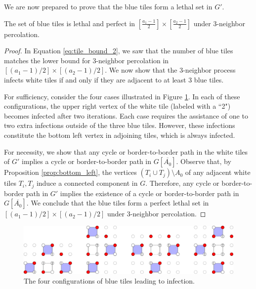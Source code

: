 We are now prepared to prove that the blue tiles form a lethal set in $G'$.

\begin{lem}
\label{lem:blue_lethal}
The set of blue tiles is lethal and perfect in $[\tfrac{a_1-1}{2}] \times [\tfrac{a_2-1}{2}]$ under 3-neighbor percolation.
\end{lem}

\begin{proof}
In Equation \ref{eq:tile_bound_2}, we saw that the number of blue tiles matches the lower bound for 3-neighbor percolation in $[(a_1-1)/2] \times [(a_2-1)/2]$. We now show that the 3-neighbor process infects white tiles if and only if they are adjacent to at least 3 blue tiles.

For sufficiency, consider the four cases illustrated in Figure \ref{fig:tile_infection}. In each of these configurations, the upper right vertex of the white tile (labeled with a ``2") becomes infected after two iterations. Each case requires the assistance of one to two extra infections outside of the three blue tiles. However, these infections constitute the bottom left vertex in adjoining tiles, which is always infected.

For necessity, we show that any cycle or border-to-border path in the white tiles of $G'$ implies a cycle or border-to-border path in $G[\overline{A_0}]$. Observe that, by Proposition \ref{prop:bottom_left}, the vertices $(T_i \cup T_{j}) \setminus A_0$ of any adjacent white tiles $T_i, T_j$ induce a connected component in $G$. Therefore, any cycle or border-to-border path in $G'$ implies the existence of a cycle or border-to-border path in $G[\overline{A_0}]$. We conclude that the blue tiles form a perfect lethal set in $[(a_1-1)/2] \times [(a_2-1)/2]$ under 3-neighbor percolation.
\end{proof}

\begin{figure}[]
\centering
\includegraphics[width=\textwidth]{figures/6/tile_infection.pdf}
\caption{The four configurations of blue tiles leading to infection.}
\label{fig:tile_infection}
\end{figure} 


